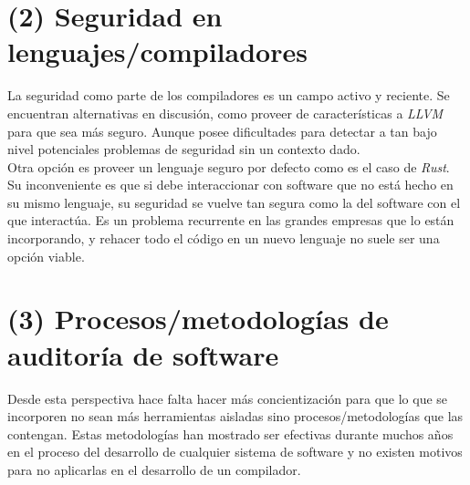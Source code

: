 \section{(2) Seguridad en lenguajes/compiladores}
La seguridad como parte de los compiladores es un campo activo y reciente. Se encuentran alternativas en discusión, como proveer de características a \textit{LLVM}\cite{EbecosmCompilation}\cite{EbecosmSecurityCompilers} para que sea más seguro. Aunque posee dificultades para detectar a tan bajo nivel potenciales problemas de seguridad sin un contexto dado.\\

Otra opción es proveer un lenguaje seguro por defecto como es el caso de \textit{Rust}. Su inconveniente es que si debe interaccionar con software que no está hecho en su mismo lenguaje, su seguridad se vuelve tan segura como la del software con el que interactúa. Es un problema recurrente en las grandes empresas que lo están incorporando, y rehacer todo el código en un nuevo lenguaje no suele ser una opción viable.\\

\section{(3) Procesos/metodologías de auditoría de software}
Desde esta perspectiva hace falta hacer más concientización para que lo que se incorporen no sean más herramientas aisladas sino procesos/metodologías que las contengan. Estas metodologías han mostrado ser efectivas durante muchos años en el proceso del desarrollo de cualquier sistema de software y no existen motivos para no aplicarlas en el desarrollo de un compilador. 
